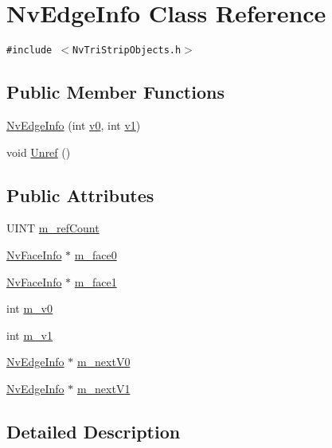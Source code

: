 \hypertarget{class_nv_edge_info}{
\section{NvEdgeInfo Class Reference}
\label{class_nv_edge_info}
}
{\tt \#include $<$NvTriStripObjects.h$>$}

\subsection*{Public Member Functions}
\begin{CompactItemize}
\item 
\hyperlink{class_nv_edge_info_46d291d321a07131f767b0a6c3584bd6}{NvEdgeInfo} (int \hyperlink{glext__bak_8h_8f5597b6002609ead33af221dcf29790}{v0}, int \hyperlink{glext__bak_8h_435c176a02c061b43e19bdf7c86cceae}{v1})
\item 
void \hyperlink{class_nv_edge_info_8a2041a388aa36374a480b8122edb852}{Unref} ()
\end{CompactItemize}
\subsection*{Public Attributes}
\begin{CompactItemize}
\item 
UINT \hyperlink{class_nv_edge_info_1fb4a1a1d3229639c3861c17828f417e}{m\_\-refCount}
\item 
\hyperlink{class_nv_face_info}{NvFaceInfo} $\ast$ \hyperlink{class_nv_edge_info_aaa29908d45f884793dff67511067d39}{m\_\-face0}
\item 
\hyperlink{class_nv_face_info}{NvFaceInfo} $\ast$ \hyperlink{class_nv_edge_info_6031db0057791a0e50693be9ee9773c7}{m\_\-face1}
\item 
int \hyperlink{class_nv_edge_info_ab5ae98466f8fc0410c6aef3b8a59036}{m\_\-v0}
\item 
int \hyperlink{class_nv_edge_info_063470f926ea6ee73985f6c8986d8ce0}{m\_\-v1}
\item 
\hyperlink{class_nv_edge_info}{NvEdgeInfo} $\ast$ \hyperlink{class_nv_edge_info_d04625aff80b39f74e71de9e2fe641d9}{m\_\-nextV0}
\item 
\hyperlink{class_nv_edge_info}{NvEdgeInfo} $\ast$ \hyperlink{class_nv_edge_info_14950ee3291cc7197890f906fe9ed746}{m\_\-nextV1}
\end{CompactItemize}


\subsection{Detailed Description}


